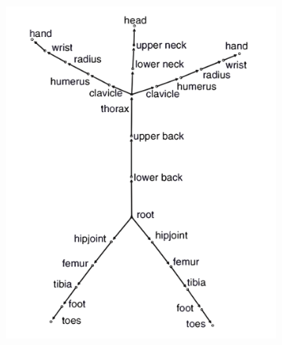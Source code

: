 \begin{figure}[ht]
    \centering
    \begin{subfigure}[b]{0.4\textwidth}
        \includegraphics[width=\textwidth]{figures/motion-capture-data/Skeleton_image.png}
        \caption{}
        \label{fig:skeleton}
    \end{subfigure}
    \hfill
    \begin{subfigure}[b]{0.4\textwidth}

\end{subfigure}
\end{figure}
